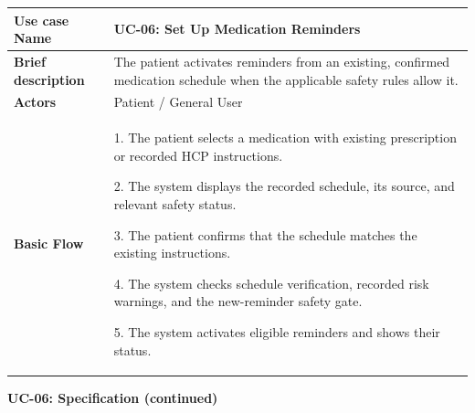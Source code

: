 \begin{longtable}{|p{}|p{}|}
\hline
\textbf{Use case Name} & UC-06: Set Up Medication Reminders \\ \hline
\textbf{Brief description} & The patient activates reminders from an existing, confirmed medication schedule when the applicable safety rules allow it. \\ \hline
\textbf{Actors} & Patient / General User \\ \hline
\textbf{Basic Flow} &
1. The patient selects a medication with existing prescription or recorded HCP instructions.\par
2. The system displays the recorded schedule, its source, and relevant safety status.\par
3. The patient confirms that the schedule matches the existing instructions.\par
4. The system checks schedule verification, recorded risk warnings, and the new-reminder safety gate.\par
5. The system activates eligible reminders and shows their status.
\\ \hline
\end{longtable}
\clearpage
\noindent\textbf{UC-06: Specification (continued)}
